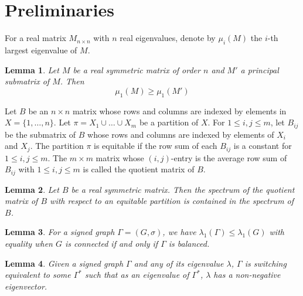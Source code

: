 \documentclass[10pt,a4paper]{amsart}
\numberwithin{equation}{section}
\newtheorem {Lemma}{Lemma}[section]
\begin{document}
\section{Preliminaries}



For a real matrix $M_{n\times n}$ with $n$ real eigenvalues, denote by  $\mu_i(M)$ the $i$-th largest eigenvalue of $M$.


\begin{Lemma}\label{interlace}\cite{HJ}
Let $M$ be a real symmetric matrix of order $n$ and $M'$ a principal submatrix of $M$. Then 
\[
\mu_1(M)\ge \mu_1(M')
\]
\end{Lemma}


Let $B$ be an $n\times n$ matrix whose rows and columns are indexed by elements in $X=\{1, \dots, n\}$.  Let $\pi=X_1\cup \dots\cup X_m$ be a partition of $X$. For $1\le i,j\le m$, let $B_{ij}$ be the submatrix of $B$ whose rows and columns are indexed by elements of $X_i$ and $X_j$. The partition $\pi$ is equitable if the row sum of each $B_{ij}$ is a constant for $1\le i,j\le m$. The $m\times m$ matrix whose $(i,j)$-entry is the average row sum of $B_{ij}$ with $1\le i,j\le m$ is called the quotient matrix of $B$.



\begin{Lemma}\label{QM}\cite[Lemma 2.3.1]{BH}
Let $B$ be a real symmetric matrix. Then the spectrum of the quotient matrix of $B$ with respect to an equitable partition is contained in the spectrum of $B$.
\end{Lemma}



\begin{Lemma}\label{under}\cite{St1}
For a signed graph $\Gamma=(G,\sigma)$, we have $\lambda_1(\Gamma)\le\lambda_1(G)$ with equality when $G$ is connected if and only if $\Gamma$ is balanced.
\end{Lemma}



\begin{Lemma}\label{L+}\cite{Stan,SL}
Given a signed graph $\Gamma$ and any of its eigenvalue $\lambda$, $\Gamma$  is switching equivalent to some $\Gamma^*$ such that as an eigenvalue of $\Gamma^*$, $\lambda$ has a non-negative eigenvector.
\end{Lemma}
\end{document}
